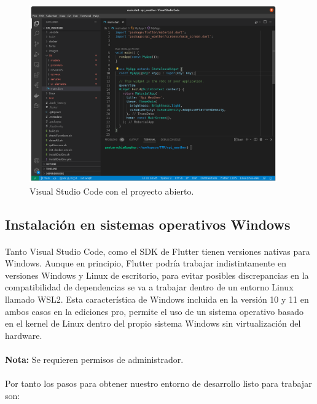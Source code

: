 \begin{figure}[H]
    \centering
    \includegraphics[width=0.95\textwidth]{imgs/vscode-ready}
	\caption[Visual Studio Code]{Visual Studio Code con el proyecto abierto.}
	\label{imgs:vscode-ready}
\end{figure}


\subsection{Instalación en sistemas operativos Windows}

\paragraph{}Tanto Visual Studio Code, como el \gls{SDK} de Flutter tienen versiones
nativas para Windows. Aunque en principio, Flutter podría trabajar indistintamente en
versiones Windows y Linux de escritorio, para evitar posibles discrepancias en la
compatibilidad de dependencias se va a trabajar dentro de un entorno Linux llamado
\gls{WSL2}. Esta característica de Windows incluida en la versión 10 y 11 en ambos
casos en la ediciones pro, permite el uso de un sistema operativo basado en el kernel
de Linux dentro del propio sistema Windows sin virtualización del hardware.

\paragraph{}\textbf{Nota:} Se requieren permisos de administrador.

\paragraph{}Por tanto los pasos para obtener nuestro entorno de desarrollo listo para
trabajar son:

